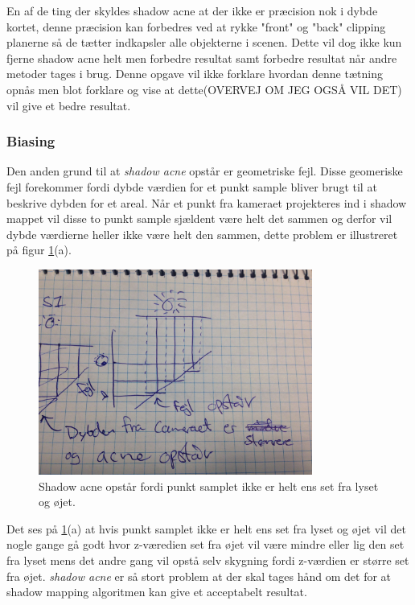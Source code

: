 \documentclass[11pt,a4paper]{article}
\begin{document}
En af de ting der skyldes shadow acne at der ikke er præcision nok i dybde kortet, denne præcision kan forbedres ved at rykke  "front"  og "back" clipping planerne så de tætter indkapsler alle objekterne i scenen. Dette vil dog ikke kun fjerne shadow acne helt men forbedre resultat samt forbedre resultat når andre metoder tages i brug. Denne opgave vil ikke forklare hvordan denne tætning opnås men blot forklare og vise at dette(OVERVEJ OM JEG OGSÅ VIL DET) vil give et bedre resultat. 

\subsubsection{Biasing}

Den anden grund til at \textit{shadow acne} opstår er geometriske fejl. Disse geomeriske fejl forekommer fordi dybde værdien for et punkt sample bliver brugt til at beskrive dybden for et areal. Når et punkt fra kameraet projekteres ind i shadow mappet vil disse to punkt sample sjældent være helt det sammen og derfor vil dybde værdierne heller ikke være helt den sammen, dette problem er illustreret på figur \ref{S1}(a).

\begin{figure}[ht!]
\centering
\includegraphics[width=90mm]{img/S1.jpg}
\caption{Shadow acne opstår fordi punkt samplet ikke er helt ens set fra lyset og øjet.}
\label{S1}
\end{figure}

Det ses på \ref{S1}(a) at hvis punkt samplet ikke er helt ens set fra lyset og øjet vil det nogle gange gå godt hvor z-væredien set fra øjet vil være mindre eller lig den set fra lyset mens det andre gang vil opstå selv skygning fordi z-værdien er større set fra øjet. \textit{shadow acne} er så stort problem at der skal tages hånd om det for at shadow mapping algoritmen kan give et acceptabelt resultat. 
\end{document}
